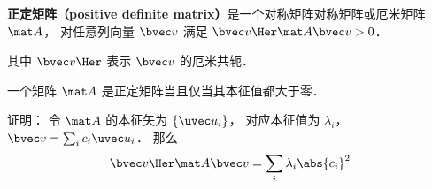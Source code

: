 

\begin{definition}{}
\textbf{正定矩阵（positive definite matrix）}是一个对称矩阵对称矩阵或厄米矩阵 $\mat A$， 对任意列向量 $\bvec v$ 满足 $\bvec v\Her \mat A \bvec v > 0$．
\end{definition}
其中 $\bvec v\Her$ 表示 $\bvec v$ 的厄米共轭．

\begin{theorem}{}
一个矩阵 $\mat A$ 是正定矩阵当且仅当其本征值都大于零．
\end{theorem}

证明： 令 $\mat A$ 的本征矢为 $\{\uvec u_i\}$， 对应本征值为 $\lambda_i$， $\bvec v = \sum_i c_i \uvec u_i$． 那么
\begin{equation}
\bvec v\Her \mat A \bvec v = \sum_i \lambda_i \abs{c_i}^2
\end{equation}

